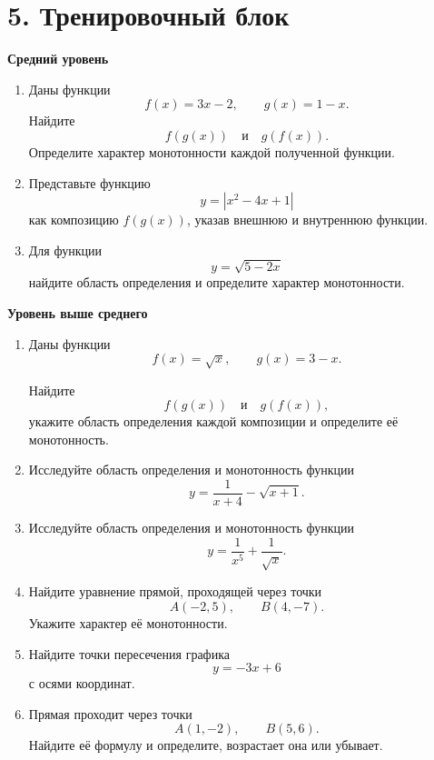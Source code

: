\documentclass[a4paper,12pt]{article}
\newcommand{\sect}[1]{\section*{\textcolor{darkaccent}{#1}}}
\begin{document}
\clearpage

\sect{5. Тренировочный блок}

\textbf{Средний уровень}

\begin{enumerate}

  \item
  Даны функции
  \[
  f(x)=3x-2,
  \qquad
  g(x)=1-x.
  \]
  Найдите
  \[
  f(g(x))
  \quad\text{и}\quad
  g(f(x)).
  \]
  Определите характер монотонности каждой полученной функции.

  \item
  Представьте функцию
  \[
  y=\left|x^2-4x+1\right|
  \]
  как композицию $f(g(x))$, указав внешнюю и внутреннюю функции.

  \item
  Для функции
  \[
  y=\sqrt{5-2x}
  \]
  найдите область определения и определите характер монотонности.

\end{enumerate}

\textbf{Уровень выше среднего}

\begin{enumerate}[resume]

  \item
  Даны функции
  \[
  f(x)=\sqrt{x},
  \qquad
  g(x)=3-x.
  \]

  Найдите
  \[
  f(g(x))
  \quad\text{и}\quad
  g(f(x)),
  \]
  укажите область определения каждой композиции
  и определите её монотонность.

  \item
  Исследуйте область определения и монотонность функции
  \[
  y=\frac1{x+4}-\sqrt{x+1}.
  \]

  \item
  Исследуйте область определения и монотонность функции
  \[
  y=\frac1{x^5}+\frac1{\sqrt{x}}.
  \]

  \item
  Найдите уравнение прямой, проходящей через точки
  \[
  A(-2,5),
  \qquad
  B(4,-7).
  \]
  Укажите характер её монотонности.

  \item
  Найдите точки пересечения графика
  \[
  y=-3x+6
  \]
  с осями координат.

  \item
  Прямая проходит через точки
  \[
  A(1,-2),
  \qquad
  B(5,6).
  \]
  Найдите её формулу и определите,
  возрастает она или убывает.

\end{enumerate}
\end{document}
